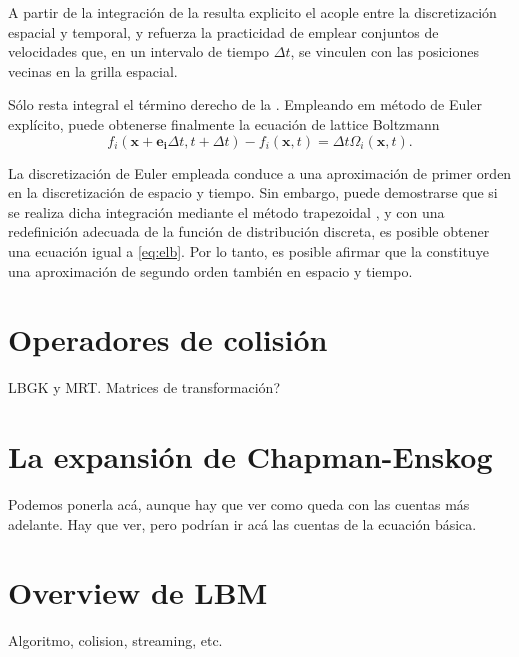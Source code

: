 A partir de la integraci\'on de la  resulta explicito el acople entre la discretizaci\'on espacial y temporal, y refuerza la practicidad de emplear conjuntos de velocidades que, en un intervalo de tiempo $\Delta t$, se vinculen con las posiciones vecinas en la grilla espacial.
\par 
S\'olo resta integral el t\'ermino derecho de la . Empleando em m\'etodo de Euler expl\'icito, puede obtenerse finalmente la ecuaci\'on de lattice Boltzmann
\begin{equation}
	f_i(\bm{x}+\bm{e_i}\Delta t,t+\Delta t)-f_i(\bm{x},t)=\Delta t\Omega_i(\bm{x},t).
	\label{eq:elb}
\end{equation}

La discretizaci\'on de Euler empleada conduce a una aproximaci\'on de primer orden en la discretizaci\'on de espacio y tiempo. Sin embargo, puede demostrarse que si se realiza dicha integraci\'on mediante el m\'etodo trapezoidal \cite{he_discrete_1998}, y con una redefinici\'on adecuada de la funci\'on de distribuci\'on discreta, es posible obtener una ecuaci\'on igual a \ref{eq:elb}. Por lo tanto, es posible afirmar que la  constituye una aproximaci\'on de segundo orden tambi\'en en espacio y tiempo.

\section{Operadores de colisi\'on}
LBGK y MRT. Matrices de transformaci\'on?

\section{La expansi\'on de Chapman-Enskog}
Podemos ponerla ac\'a, aunque hay que ver como queda con las cuentas m\'as adelante.
Hay que ver, pero podr\'ian ir ac\'a las cuentas de la ecuaci\'on b\'asica.

\section{Overview de LBM}
Algoritmo, colision, streaming, etc.